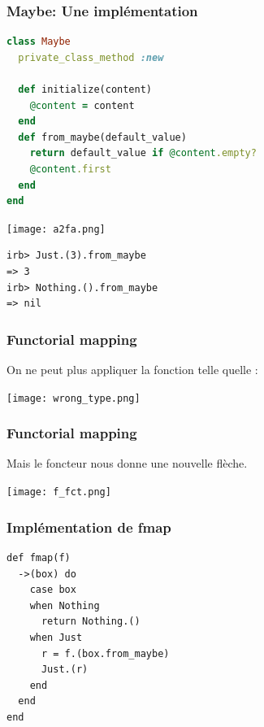 \documentclass{beamer}
\begin{document}
\begin{frame}[fragile]
\frametitle{Maybe: Une implémentation}
\begin{block}{}
\begin{lstlisting}[language=ruby,basicstyle=\ttfamily,keywordstyle=\color{red}]
class Maybe
  private_class_method :new

  def initialize(content)
    @content = content
  end
  def from_maybe(default_value)
    return default_value if @content.empty?
    @content.first
  end
end
\end{lstlisting}
\end{block}
\end{frame}

\begin{frame}[fragile]

\begin{center}
\texttt{[image: a2fa.png]}
\end{center}

\begin{block}{}
\begin{lstlisting}[basicstyle=\ttfamily,keywordstyle=\color{red}]
irb> Just.(3).from_maybe
=> 3
irb> Nothing.().from_maybe
=> nil
\end{lstlisting}
\end{block}
\end{frame}


\begin{frame}
\frametitle{Functorial mapping}
On ne peut plus appliquer la fonction telle quelle :

\begin{center}
\texttt{[image: wrong\_type.png]}
\end{center}
\end{frame}

\begin{frame}
\frametitle{Functorial mapping}
Mais le foncteur nous donne une nouvelle flèche.
\begin{center}
\texttt{[image: f\_fct.png]}
\end{center}
\end{frame}

\begin{frame}[fragile]
  \frametitle{Implémentation de fmap}
  \begin{block}{}
    \begin{lstlisting}
def fmap(f)
  ->(box) do
    case box
    when Nothing
      return Nothing.()
    when Just
      r = f.(box.from_maybe)
      Just.(r)
    end
  end
end
    \end{lstlisting}
  \end{block}
\end{frame}
\end{document}

